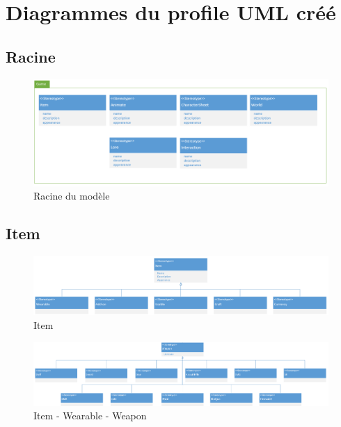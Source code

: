 \appendix
\chapter{Diagrammes du profile UML créé}

\section{Racine}
\begin{figure}[H]
    \begin{center}
    \includegraphics[width=14cm]{10_img/Z_annexeA/00.PNG} 
    \caption{Racine du modèle}
    \label{A-racine}
    \end{center}
\end{figure}

\newpage
\section{Item}
\begin{figure}
    \begin{center}
    \includegraphics[width=20cm]{10_img/Z_annexeA/item_racine.PNG} 
    \caption{Item}
    \label{A-item-racine}
    \end{center}
\end{figure}

\newpage
\begin{figure}
    \begin{center}
    \includegraphics[width=20cm]{10_img/Z_annexeA/item_wearable_weapon.PNG} 
    \caption{Item - Wearable - Weapon}
    \label{A-Weapon}
    \end{center}
\end{figure}

